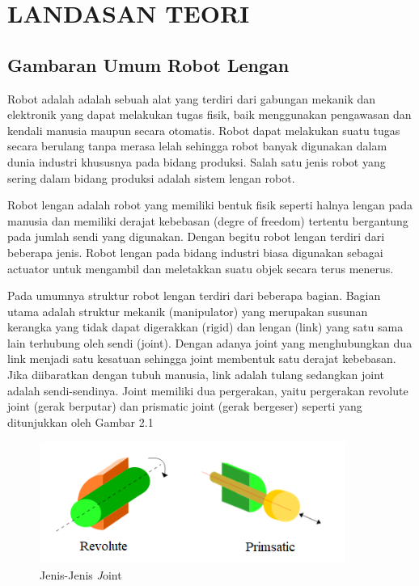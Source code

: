 \chapter{LANDASAN TEORI}

\section{Gambaran Umum Robot Lengan}

Robot adalah adalah sebuah alat yang terdiri dari gabungan mekanik dan elektronik yang dapat melakukan tugas fisik, baik menggunakan pengawasan dan kendali manusia maupun secara otomatis. Robot dapat melakukan suatu tugas secara berulang tanpa merasa lelah sehingga robot banyak digunakan dalam dunia industri khususnya pada bidang produksi. Salah satu jenis robot yang sering dalam bidang produksi adalah sistem lengan robot.

Robot lengan adalah robot yang memiliki bentuk fisik seperti halnya lengan pada manusia dan memiliki derajat kebebasan (degre of freedom) tertentu bergantung pada jumlah sendi yang digunakan. Dengan begitu robot lengan terdiri dari beberapa jenis. Robot lengan pada bidang industri biasa digunakan sebagai actuator untuk mengambil dan meletakkan suatu objek secara terus menerus.
	

Pada umumnya struktur robot lengan terdiri dari beberapa bagian.  Bagian utama adalah struktur mekanik (manipulator) yang merupakan susunan kerangka yang tidak dapat digerakkan (rigid) dan lengan (link) yang satu sama lain terhubung oleh sendi (joint). Dengan adanya joint yang menghubungkan dua link menjadi satu kesatuan sehingga joint membentuk satu derajat kebebasan. Jika diibaratkan dengan tubuh manusia, link adalah tulang sedangkan joint adalah sendi-sendinya. Joint memiliki dua pergerakan, yaitu pergerakan revolute joint (gerak berputar) dan prismatic joint (gerak bergeser) seperti yang ditunjukkan oleh Gambar 2.1

	\begin{figure}[H]
	\centering
	\includegraphics[width=10cm]{gambar/joint.png}
	\caption{Jenis-Jenis \emph Joint}
\end{figure}

